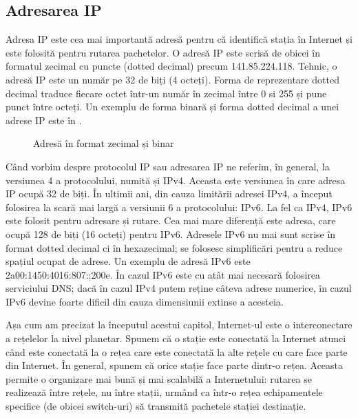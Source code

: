 \subsection{Adresarea IP}
\label{sec:net:ip-address}

Adresa IP este cea mai importantă adresă pentru că identifică stația în Internet și este folosită pentru rutarea pachetelor. O adresă IP este scrisă de obicei în formatul zecimal cu puncte (dotted decimal) precum 141.85.224.118. Tehnic, o adresă IP este un număr pe 32 de biți (4 octeți). Forma de reprezentare dotted decimal traduce fiecare octet într-un număr în zecimal între 0 si 255 și pune punct între octeți. Un exemplu de forma binară și forma dotted decimal a unei adrese IP este în .

\begin{figure}[htbp]
  \centering
  \def\svgwidth{\columnwidth}
  
  \caption{Adresă în format zecimal și binar}
  \label{fig:net:ip-address-formats}
\end{figure}

Când vorbim despre protocolul IP sau adresarea IP ne referim, în general, la versiunea 4 a protocolului, numită și IPv4. Aceasta este versiunea în care adresa IP ocupă 32 de biți. În ultimii ani, din cauza limitării adresei IPv4, a început folosirea la scară mai largă a versiunii 6 a protocolului: IPv6. La fel ca IPv4, IPv6 este folosit pentru adresare și rutare. Cea mai mare diferență este adresa, care ocupă 128 de biți (16 octeți) pentru IPv6. Adresele IPv6 nu mai sunt scrise în format dotted decimal ci în hexazecimal; se folosesc simplificări pentru a reduce spațiul ocupat de adrese. Un exemplu de adresă IPv6 este 2a00:1450:4016:807::200e. În cazul IPv6 este cu atât mai necesară folosirea serviciului DNS; dacă în cazul IPv4 putem reține câteva adrese numerice, în cazul IPv6 devine foarte dificil din cauza dimensiunii extinse a acesteia.

Așa cum am precizat la începutul acestui capitol, Internet-ul este o interconectare a rețelelor la nivel planetar. Spunem că o stație este conectată la Internet atunci când este conectată la o rețea care este conectată la alte rețele cu care face parte din Internet. În general, spunem că orice stație face parte dintr-o rețea. Aceasta permite o organizare mai bună și mai scalabilă a Internetului: rutarea se realizează între rețele, nu între stații, urmând ca într-o rețea echipamentele specifice (de obicei switch-uri) să transmită pachetele stației destinație.

